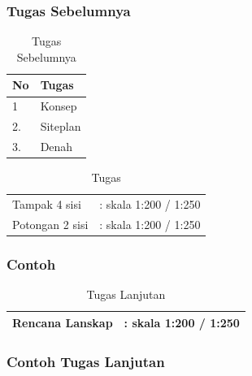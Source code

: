 \documentclass[../main.tex]{subfiles}
\begin{document}
\begin{frame}[mytitle=standard,t,mycolor=digiPH_purple,dark]
	\frametitle{Tugas Sebelumnya}
	\begin{table}[htb]
		\caption{Tugas Sebelumnya}
		\begin{tabularx}{\textwidth}{|p{1cm}|X|}
			\hline
			\textbf{No} & \textbf{Tugas} \\ \hline
			1           & Konsep         \\ \hline
			2.          & Siteplan       \\\hline
			3.          & Denah          \\\hline
		\end{tabularx}
	\end{table}
\end{frame}

\begin{frame}[mytitle=standard,c,mycolor=digiPH_uniblue,light]

	\begin{table}
		\caption{Tugas}\label{tab:}
		\begin{center}
			\begin{tabular}[c]{lp{}}
				\hline
				Tampak 4 sisi   & : skala 1:200 / 1:250 \\
				Potongan 2 sisi & : skala 1:200 / 1:250 \\
				\hline
			\end{tabular}
		\end{center}
	\end{table}
\end{frame}
\begin{frame}[mytitle=standard,c,mycolor=digiPH_purple,dark] \frametitle{Contoh} \end{frame}

\begin{frame}[mytitle=standard,c,mycolor=digiPH_uniblue,light]

	\begin{table}
		\caption{Tugas Lanjutan}\label{tab:}
		\begin{center}
			\begin{tabular}[c]{lp{}}
				\hline
				Rencana Lanskap & : skala 1:200 / 1:250 \\
				\hline
			\end{tabular}
		\end{center}
	\end{table}
\end{frame}

\begin{frame}[mytitle=standard,c,mycolor=digiPH_purple,dark] \frametitle{Contoh Tugas Lanjutan} \end{frame}

\end{document}

